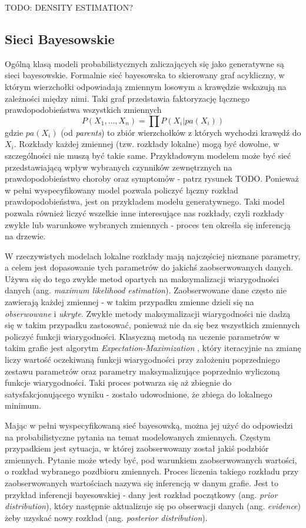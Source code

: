 \documentclass[magisterska]{pracamgr}
\renewcommand{\cite}{\citep}
\begin{document}
TODO: DENSITY ESTIMATION?

\subsection{Sieci Bayesowskie}

Ogólną klasą modeli probabilistycznych zaliczających się jako generatywne są sieci bayesowskie. Formalnie sieć bayesowska to skierowany graf acykliczny, w którym wierzchołki odpowiadają zmiennym losowym a krawędzie wskazują na zależności między nimi. Taki graf przedstawia faktoryzację łącznego prawdopodobieństwa wszystkich zmiennych
\begin{equation}
    P(X_1, \ldots, X_n) = \prod P(X_i | pa(X_i))
\end{equation}
gdzie $pa(X_i)$ (od \textit{parents}) to zbiór wierzchołków z których wychodzi krawędź do $X_i$. Rozkłady każdej zmiennej (tzw. rozkłady lokalne) mogą być dowolne, w szczególności nie muszą być takie same. Przykładowym modelem może być sieć przedstawiającą wpływ wybranych czynników zewnętrznych na prawdopodobieństwo choroby oraz symptomów  - patrz rysunek TODO. Ponieważ w pełni wyspecyfikowany model pozwala policzyć łączny rozkład prawdopodobieństwa, jest on przykładem modelu generatywnego. Taki model pozwala również liczyć wszelkie inne interesujące nas rozkłady, czyli rozkłady zwykłe lub warunkowe wybranych zmiennych - proces ten określa się inferencją na drzewie.

W rzeczywistych modelach lokalne rozkłady mają najczęściej nieznane parametry, a celem jest dopasowanie tych parametrów do jakichś zaobserwowanych danych. Używa się do tego zwykle metod opartych na maksymalizacji wiarygodności danych (ang. \textit{maximum likelihood estimation}). Zaobserwowane dane często nie zawierają każdej zmiennej - w takim przypadku zmienne dzieli się na \textit{obserwowane} i \textit{ukryte}. Zwykłe metody maksymalizacji wiarygodności nie dadzą się w takim przypadku zastosować, ponieważ nie da się bez wszystkich zmiennych policzyć funkcji wiarygodności. Klasyczną metodą na uczenie parametrów w takim grafie jest algorytm \textit{Expectation-Maximization} \cite{dempster1977emalgorithm}, który iteracyjnie na zmianę liczy wartość oczekiwaną funkcji wiarygodności przy założeniu poprzedniego zestawu parametrów oraz parametry maksymalizujące poprzednio wyliczoną funkcje wiarygodności. Taki proces potwarza się aż zbiegnie do satysfakcjonującego wyniku - zostało udowodnione, że zbiega do lokalnego minimum.

Mając w pełni wyspecyfikowaną sieć bayesowską, można jej użyć do odpowiedzi na probabilistyczne pytania na temat modelowanych zmiennych. Częstym przypadkiem jest sytuacja, w której zaobserwowany został jakiś podzbiór zmiennych. Pytanie może wtedy być, pod warunkiem zaobserwowanych wartości, o rozkład wybranego pozdbioru zmiennych. Proces liczenia takiego rozkładu przy zaobserwowanych wartościach nazywa się inferencją w danym grafie. Jest to przykład inferencji bayesowskiej - dany jest rozkład początkowy (ang. \textit{prior distribution}), który następnie aktualizuje się po obserwacji danych (ang. \textit{evidence}) żeby uzyskać nowy rozkład (ang. \textit{posterior distribution}).
\end{document}
